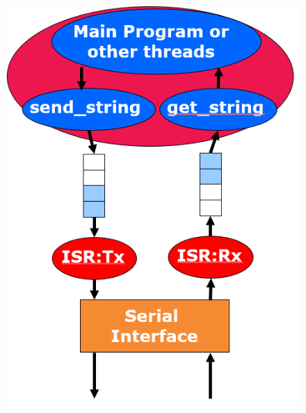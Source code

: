 \documentclass[10.5pt,scale=1.0,t,aspectratio=169,hyperref={pdfpagelabels=false}]{beamer}
\begin{document}
\begin{frame}
\begin{columns}
		\begin{figure}
			\centering
			\includegraphics[scale=0.35]{08_SerialInterrupt}
		\end{figure}
	\end{columns}
\end{frame}
\end{document}
